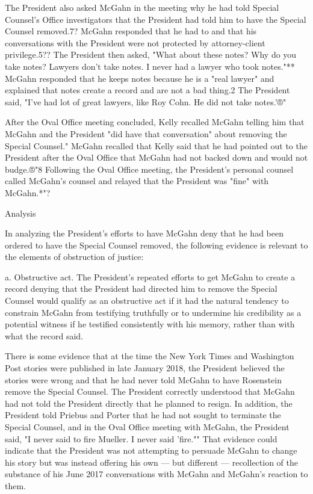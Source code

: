The President also asked McGahn in the meeting why he had told Special Counsel's Office investigators that the President had told him to have the Special Counsel removed.7?
McGahn responded that he had to and that his conversations with the President were not protected by attorney-client privilege.5??
The President then asked, "What about these notes? Why do you take notes? Lawyers don't take notes.
I never had a lawyer who took notes."**
McGahn responded that he keeps notes because he is a "real lawyer" and explained that notes create a record and are not a bad thing.2
The President said, "I've had lot of great lawyers, like Roy Cohn.
He did not take notes.'®"

After the Oval Office meeting concluded, Kelly recalled McGahn telling him that McGahn and the President "did have that conversation" about removing the Special Counsel."
McGahn recalled that Kelly said that he had pointed out to the President after the Oval Office that McGahn had not backed down and would not budge.®"8
Following the Oval Office meeting, the President's personal counsel called McGahn's counsel and relayed that the President was "fine" with McGahn.*"?

Analysis

In analyzing the President's efforts to have McGahn deny that he had been ordered to have the Special Counsel removed, the following evidence is relevant to the elements of obstruction of justice:

a. Obstructive act.
The President's repeated efforts to get McGahn to create a record denying that the President had directed him to remove the Special Counsel would qualify as an obstructive act if it had the natural tendency to constrain McGahn from testifying truthfully or to undermine his credibility as a potential witness if he testified consistently with his memory, rather than with what the record said.

There is some evidence that at the time the New York Times and Washington Post stories were published in late January 2018, the President believed the stories were wrong and that he had never told McGahn to have Rosenstein remove the Special Counsel.
The President correctly understood that McGahn had not told the President directly that he planned to resign.
In addition, the President told Priebus and Porter that he had not sought to terminate the Special Counsel, and in the Oval Office meeting with McGahn, the President said, "I never said to fire Mueller.
I never said 'fire.""
That evidence could indicate that the President was not attempting to persuade McGahn to change his story but was instead offering his own — but different — recollection of the substance of his June 2017 conversations with McGahn and McGahn's reaction to them.

